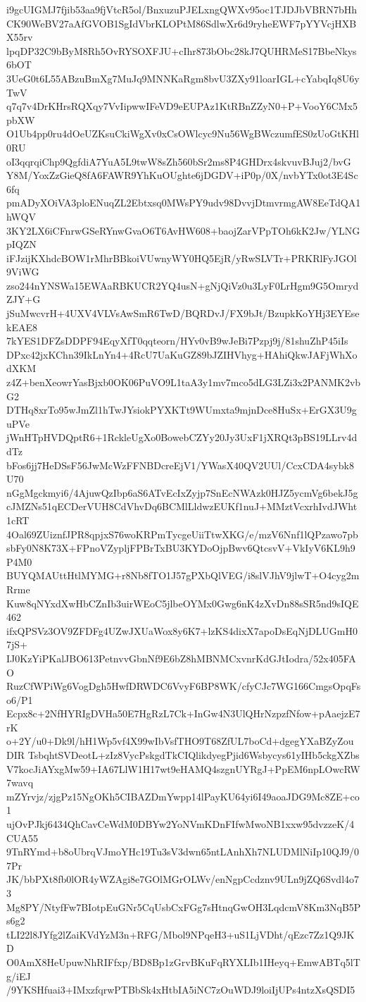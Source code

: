 i9gcUIGMJ7fjib53aa9fjVtcR5ol/BnxuzuPJELxngQWXv95oc1TJDJbVBRN7bHh
CK90WeBV27aAfGVOB1SgIdVbrKLOPtM86SdlwXr6d9ryheEWF7pYYVcjHXBX55rv
lpqDP32C9bByM8Rh5OvRYSOXFJU+cIhr873bObc28kJ7QUHRMeS17BbeNkys6bOT
3UeG0t6L55ABzuBmXg7MuJq9MNNKaRgm8bvU3ZXy91loarIGL+cYabqIq8U6yTwV
q7q7v4DrKHrsRQXqy7VvIipwwIFeVD9eEUPAz1KtRBnZZyN0+P+VooY6CMx5pbXW
O1Ub4pp0ru4dOeUZKsuCkiWgXv0xCsOWlcyc9Nu56WgBWczumfES0zUoGtKHl0RU
oI3qqrqiChp9QgfdiA7YuA5L9twW8sZh560bSr2ms8P4GHDrx4skvuvBJuj2/bvG
Y8M/YoxZzGieQ8fA6FAWR9YhKuOUghte6jDGDV+iP0p/0X/nvbYTx0ot3E4Sc6fq
pmADyXOiVA3ploENuqZL2Ebtxsq0MWsPY9udv98DvvjDtmvrmgAW8EeTdQA1hWQV
3KY2LX6iCFnrwGSeRYnwGvaO6T6AvHW608+baojZarVPpTOh6kK2Jw/YLNGpIQZN
iFJzijKXhdcBOW1rMhrBBkoiVUwnyWY0HQ5EjR/yRwSLVTr+PRKRlFyJGOl9ViWG
zso244nYNSWa15EWAaRBKUCR2YQ4usN+gNjQiVz0u3LyF0LrHgm9G5OmrydZJY+G
jSuMwcvrH+4UXV4VLVsAwSmR6TwD/BQRDvJ/FX9bJt/BzupkKoYHj3EYEsekEAE8
7kYES1DFZsDDPF94EqyXfT0qqteorn/HYv0vB9wJeBi7Pzpj9j/81shuZhP45iIs
DPxc42jxKChn39IkLnYn4+4RcU7UaKuGZ89bJZIHVhyg+HAhiQkwJAFjWhXodXKM
z4Z+benXeowrYasBjxb0OK06PuVO9L1taA3y1mv7mco5dLG3LZi3x2PANMK2vbG2
DTHq8xrTo95wJmZl1hTwJYsiokPYXKTt9WUmxta9mjnDce8HuSx+ErGX3U9guPVe
jWnHTpHVDQptR6+1RckleUgXo0BowebCZYy20Jy3UxF1jXRQt3pBS19LLrv4ddTz
bFos6jj7HeDSsF56JwMcWzFFNBDcreEjV1/YWasX40QV2UUl/CcxCDA4sybk8U70
nGgMgckmyi6/4AjuwQzIbp6aS6ATvEcIxZyjp7SnEcNWAzk0HJZ5ycmVg6bekJ5g
cJMZNs51qECDerVUH8CdVhvDq6BCMlLldwzEUKf1nuJ+MMztVcxrhIvdJWht1cRT
4Oal69ZUiznfJPR8qpjxS76woKRPmTycgeUiiTtwXKG/e/mzV6Nnf1lQPzawo7pb
sbFy0N8K73X+FPnoVZypljFPBrTxBU3KYDoOjpBwv6QtcsvV+VkIyV6KL9h9P4M0
BUYQMAUttHtlMYMG+r8Nb8fTO1J57gPXbQlVEG/i8slVJhV9jlwT+O4cyg2mRrme
Kuw8qNYxdXwHbCZnIb3uirWEoC5jlbeOYMx0Gwg6nK4zXvDn88sSR5nd9sIQE462
ifxQPSVz3OV9ZFDFg4UZwJXUaWox8y6K7+lzKS4dixX7apoDsEqNjDLUGmH07jS+
IJ0KzYiPKalJBO613PetnvvGbnNf9E6bZ8hMBNMCxvnrKdGJtIodra/52x405FAO
RuzCfWPiWg6VogDgh5HwfDRWDC6VvyF6BP8WK/cfyCJc7WG166CmgsOpqFso6/P1
Ecpx8c+2NfHYRIgDVHa50E7HgRzL7Ck+InGw4N3UlQHrNzpzfNfow+pAaejzE7rK
o+2Y/u0+Dk9l/hH1Wp5vf4X99wIbVsfTHO9T68ZfUL7boCd+dgegYXaBZyZouDIR
TsbqhtSVDeotL+zIz8VycPskgdTkCIQlikdyegPjid6Wsbycys61yIHb5ckgXZbs
V7kocJiAYxgMw59+IA67LlW1H17wt9eHAMQ4szgnUYRgJ+PpEM6npLOwcRW7wavq
mZYrvjz/zjgPz15NgOKh5CIBAZDmYwpp14lPayKU64yi6I49aoaJDG9Mc8ZE+co1
ujOvPJkj6434QhCavCeWdM0DBYw2YoNVmKDnFIfwMwoNB1xxw95dvzzeK/4CUA55
9TnRYmd+b8oUbrqVJmoYHc19Tu3sV3dwn65ntLAnhXh7NLUDMlNiIp10QJ9/07Pr
JK/bbPXt8fb0lOR4yWZAgi8e7GOlMGrOLWv/enNgpCcdznv9ULn9jZQ6Svdl4o73
Mg8PY/NtyfFw7BIotpEuGNr5CqUsbCxFGg7sHtnqGwOH3LqdcmV8Km3NqB5Ps6g2
tLI22l8JYfg2lZaiKVdYzM3n+RFG/Mbol9NPqeH3+uS1LjVDht/qEzc7Zz1Q9JKD
O0AmX8HeUpuwNhRIFfxp/BD8Bp1zGrvBKuFqRYXLIb1IHeyq+EmwABTq5lTg/iEJ
/9YKSHfuai3+IMxzfqrwPTBbSk4xHtbIA5iNC7zOuWDJ9loiIjUPs4ntzXsQSDI5
